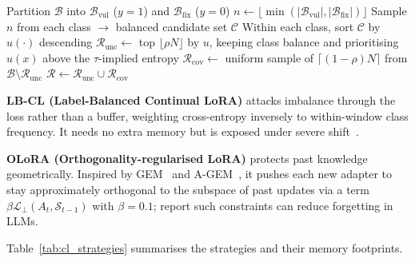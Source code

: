 \documentclass[a4paper,twoside]{article}
\begin{document}
\begin{algorithm}[t]
\SetAlgoLined
\DontPrintSemicolon
{}
\BlankLine
Partition $\mathcal{B}$ into $\mathcal{B}_{\text{vul}}$ ($y{=}1$) and $\mathcal{B}_{\text{fix}}$ ($y{=}0$)\;
$n \gets \lfloor \min(|\mathcal{B}_{\text{vul}}|,|\mathcal{B}_{\text{fix}}|)\rfloor$\;
Sample $n$ from each class $\rightarrow$ balanced candidate set $\mathcal{C}$\;
Within each class, sort $\mathcal{C}$ by $u(\cdot)$ descending\;
$\mathcal{R}_{\text{unc}} \gets$ top $\lfloor \rho N \rfloor$ by $u$, keeping class balance and prioritising $u(x)$ above the $\tau$-implied entropy\;
$\mathcal{R}_{\text{cov}} \gets$ uniform sample of $\lceil (1-\rho) N \rceil$ from $\mathcal{B}\setminus\mathcal{R}_{\text{unc}}$\;
$\mathcal{R} \gets \mathcal{R}_{\text{unc}} \cup \mathcal{R}_{\text{cov}}$\;
\;
\caption{Hybrid-CASR buffer construction}
\label{alg:hybrid-casr}
\end{algorithm}

\textbf{LB-CL (Label-Balanced Continual LoRA)} attacks imbalance through the loss rather than a buffer, weighting cross-entropy inversely to within-window class frequency. It needs no extra memory but is exposed under severe shift~\citep{Wu2024CLSurvey}.

\textbf{OLoRA (Orthogonality-regularised LoRA)} protects past knowledge geometrically. Inspired by GEM~\citep{LopezPaz2017GEM} and A-GEM~\citep{Chaudhry2019AGEM}, it pushes each new adapter to stay approximately orthogonal to the subspace of past updates via a term $\beta \mathcal{L}_\perp(A_t, \mathcal{S}_{t-1})$ with $\beta=0.1$; \citet{Song2023ConPET} report such constraints can reduce forgetting in LLMs.

Table~\ref{tab:cl_strategies} summarises the strategies and their memory footprints.
\end{document}
